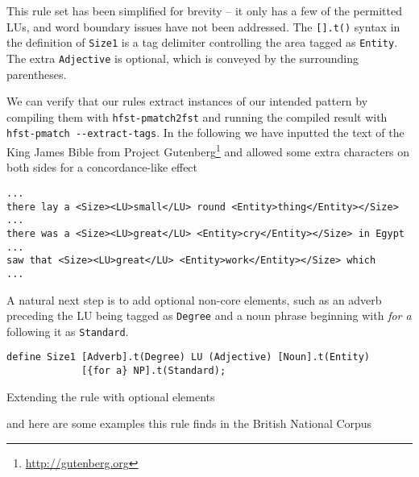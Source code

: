 \documentclass{llncs}
\begin{document}
\noindent This rule set has been simplified for brevity -- it only has a few of the
permitted LUs, and word boundary issues have not been addressed.
The \verb+[].t()+ syntax in the definition of \verb+Size1+ is a tag delimiter
controlling the area tagged as \verb+Entity+. The extra \verb+Adjective+ is
optional, which is conveyed by the surrounding parentheses.

\sloppy We can verify that our rules extract instances of our intended pattern by compiling
them with \verb+hfst-pmatch2fst+ and running the compiled result with
\verb+hfst-pmatch --extract-tags+. In the following we have
inputted the text of the King James Bible from Project
Gutenberg\footnote{\url{http://gutenberg.org}} and allowed some extra characters on both
sides for a concordance-like effect

\hfill \break
  \small
\begin{center}
  \begin{framed}
\begin{verbatim}
...
there lay a <Size><LU>small</LU> round <Entity>thing</Entity></Size>
...
there was a <Size><LU>great</LU> <Entity>cry</Entity></Size> in Egypt
...
saw that <Size><LU>great</LU> <Entity>work</Entity></Size> which
...
\end{verbatim}
\end{framed}
\end{center}
\normalsize

A natural next step is to add optional non-core elements, such as an adverb
preceding the LU being tagged as \verb+Degree+ and a noun phrase beginning with
\emph{for a} following it as \verb+Standard+.

\begin{table}[h]
\begin{center}
  \small
  \begin{framed}
\begin{verbatim}
define Size1 [Adverb].t(Degree) LU (Adjective) [Noun].t(Entity) 
             [{for a} NP].t(Standard);
\end{verbatim}
\end{framed}
\end{center}
\normalsize
\caption{Extending the rule with optional elements}
\end{table}

\noindent and here are some examples this rule finds in the British National
Corpus~\cite{bnc}
\end{document}
